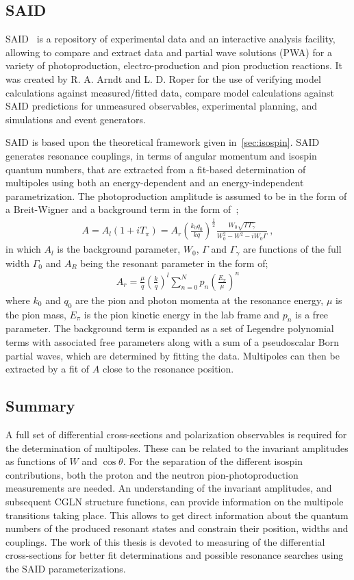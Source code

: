 \subsection{SAID}\label{sec:intro.said}

SAID~\cite{SAID} is a repository of experimental data and an interactive analysis facility, allowing to compare and extract data and partial wave solutions (PWA) for a variety of photoproduction, electro-production and pion production reactions. It was created by R. A. Arndt and L. D. Roper for the use of verifying model calculations against measured/fitted data, compare model calculations against SAID predictions for unmeasured observables, experimental planning, and simulations and event generators.

SAID is based upon the theoretical framework given in~\ref{sec:isospin}. SAID generates resonance couplings, in terms of angular momentum and isospin quantum numbers, that are extracted from a fit-based determination of multipoles using both an energy-dependent and an energy-independent parametrization. The photoproduction amplitude is assumed to be in the form of a Breit-Wigner and a background term in the form of~\cite{ar90};
\begin{align}
A=A_l(1+iT_\pi)=A_r\left(\frac{k_0q_0}{kq}\right)^{\frac{1}{2}} \frac{W_0\sqrt{\Gamma \Gamma_{\gamma}}}{W_0^2-W^2-iW_0\Gamma} \ ,
\end{align}
in which $A_l$ is the background parameter, $W_0$, $\Gamma$ and $\Gamma_{\gamma}$ are functions of the full width $\Gamma_{0}$ and $A_R$ being the resonant parameter in the form of;
\begin{align}
A_r=\frac{\mu}{q}\left(\frac{k}{q}\right)^l\sum_{n=0}^{N}p_n\left(\frac{E_{\pi}}{\mu}\right)^n
\end{align}
where $k_0$ and $q_0$ are the pion and photon momenta at the resonance energy, $\mu$ is the pion mass, $E_{\pi}$ is the pion kinetic energy in the lab frame and $p_n$ is a free parameter. The background term is expanded as a set of Legendre polynomial terms with associated free parameters along with a sum of a pseudoscalar Born partial waves, which are determined by fitting the data. Multipoles can then be extracted by a fit of $A$ close to the resonance position.

\subsection{Summary}
A full set of differential cross-sections and polarization observables is required for the determination of multipoles. These can be related to the invariant amplitudes as functions of $W$ and $\cos\theta$. For the separation of the different isospin contributions, both the proton and the neutron pion-photoproduction measurements are needed. An understanding of the invariant amplitudes, and subsequent CGLN structure functions, can provide information on the multipole transitions taking place. This  allows to get direct information about the quantum numbers of the produced resonant states and constrain their position, widths and couplings.
The work of this thesis is devoted to measuring of the differential cross-sections for better fit determinations and possible resonance searches using the SAID parameterizations.